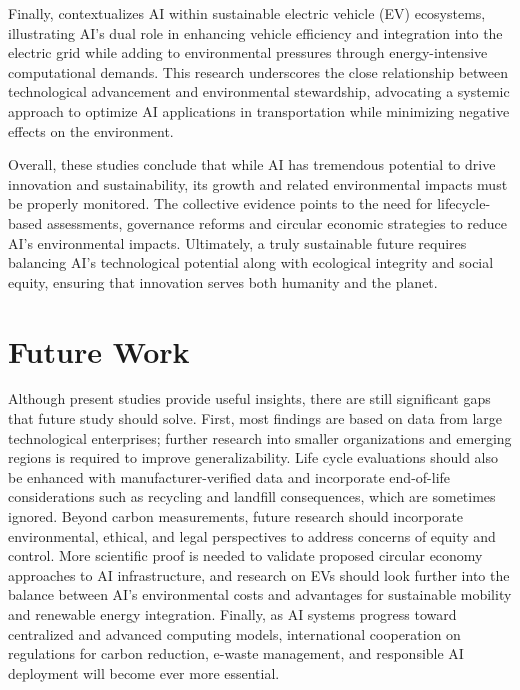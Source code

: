 \documentclass[a4paper, 12pt]{article}
\begin{document}
\par Finally, \citet{M.rauf2024} contextualizes AI within sustainable electric vehicle (EV) ecosystems, illustrating AI’s dual role in enhancing vehicle efficiency and integration into the electric grid while adding to environmental pressures through energy-intensive computational demands. This research underscores the close relationship between technological advancement and environmental stewardship, advocating a systemic approach to optimize AI applications in transportation while minimizing negative effects on the environment.  
\hfill \break
\par Overall, these studies conclude that while AI has tremendous potential to drive innovation and sustainability, its growth and related environmental impacts must be properly monitored. The collective evidence points to the need for lifecycle-based assessments, governance reforms and circular economic strategies to reduce AI's environmental impacts. Ultimately, a truly sustainable future requires balancing AI's technological potential along with ecological integrity and social equity, ensuring that innovation serves both humanity and the planet.

\section{Future Work}
Although present studies provide useful insights, there are still significant gaps that future study should solve. First, most findings are based on data from large technological enterprises; further research into smaller organizations and emerging regions is required to improve generalizability.  Life cycle evaluations should also be enhanced with manufacturer-verified data and incorporate end-of-life considerations such as recycling and landfill consequences, which are sometimes ignored. Beyond carbon measurements, future research should incorporate environmental, ethical, and legal perspectives to address concerns of equity and control.  More scientific proof is needed to validate proposed circular economy approaches to AI infrastructure, and research on EVs should look further into the balance between AI's environmental costs and advantages for sustainable mobility and renewable energy integration.  Finally, as AI systems progress toward centralized and advanced computing models, international cooperation on regulations for carbon reduction, e-waste management, and responsible AI deployment will become ever more essential.

\printbibliography
\end{document}
